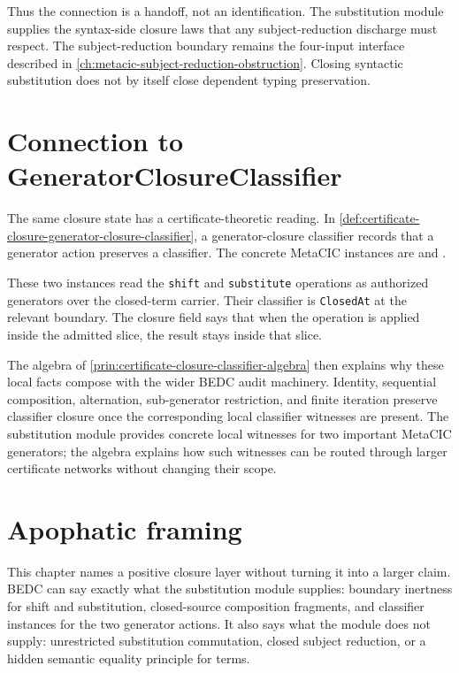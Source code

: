 Thus the connection is a handoff, not an identification. The substitution
module supplies the syntax-side closure laws that any subject-reduction
discharge must respect. The subject-reduction boundary remains the four-input
interface described in \autoref{ch:metacic-subject-reduction-obstruction}.
Closing syntactic substitution does not by itself close dependent typing
preservation.

\section{Connection to GeneratorClosureClassifier}
\label{sec:metacic-substitution-audit-map-generator-closure}

The same closure state has a certificate-theoretic reading. In
\autoref{def:certificate-closure-generator-closure-classifier}, a
generator-closure classifier records that a generator action preserves a
classifier. The concrete MetaCIC instances are
 and
.

These two instances read the \texttt{shift} and \texttt{substitute} operations
as authorized generators over the closed-term carrier. Their classifier is
\texttt{ClosedAt} at the relevant boundary. The closure field says that when
the operation is applied inside the admitted slice, the result stays inside
that slice.

The algebra of \autoref{prin:certificate-closure-classifier-algebra} then
explains why these local facts compose with the wider BEDC audit machinery.
Identity, sequential composition, alternation, sub-generator restriction, and
finite iteration preserve classifier closure once the corresponding local
classifier witnesses are present. The substitution module provides concrete
local witnesses for two important MetaCIC generators; the algebra explains how
such witnesses can be routed through larger certificate networks without
changing their scope.

\section{Apophatic framing}
\label{sec:metacic-substitution-audit-map-apophatic}

This chapter names a positive closure layer without turning it into a larger
claim. BEDC can say exactly what the substitution module supplies: boundary
inertness for shift and substitution, closed-source composition fragments,
and classifier instances for the two generator actions. It also says what the
module does not supply: unrestricted substitution commutation, closed subject
reduction, or a hidden semantic equality principle for terms.

